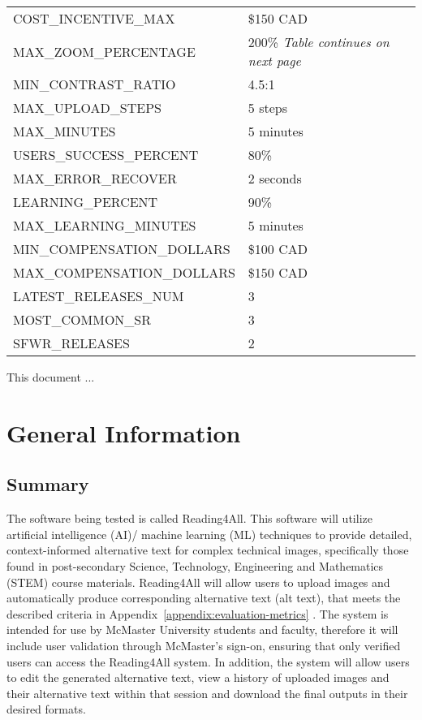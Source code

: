 \documentclass[12pt, titlepage]{article}
\begin{document}
\begin{longtable}{|p{8.0cm}|p{8.0cm}|}
COST\_INCENTIVE\_MAX & \$150 CAD \\
MAX\_ZOOM\_PERCENTAGE & 200\% \qquad\textit{Table continues on next page}\\
MIN\_CONTRAST\_RATIO & 4.5:1\\
MAX\_UPLOAD\_STEPS & 5 steps\\
MAX\_MINUTES & 5 minutes\\
USERS\_SUCCESS\_PERCENT & 80\%\\
MAX\_ERROR\_RECOVER & 2 seconds \\
LEARNING\_PERCENT & 90\% \\
MAX\_LEARNING\_MINUTES & 5 minutes \\
MIN\_COMPENSATION\_DOLLARS & \$100 CAD \\ 
MAX\_COMPENSATION\_DOLLARS & \$150 CAD \\ 
LATEST\_RELEASES\_NUM & 3 \\
MOST\_COMMON\_SR & 3 \\
SFWR\_RELEASES & 2 \\


\bottomrule
\end{longtable}

\newpage


This document ... 

\section{General Information}

\subsection{Summary}


The software being tested is called Reading4All. This software will utilize artificial intelligence (AI)/
machine learning (ML) techniques to provide detailed, context-informed alternative text for complex technical images, specifically those found in post-secondary Science, Technology, Engineering and Mathematics (STEM)
course materials. Reading4All will allow users to upload images and automatically produce corresponding alternative text (alt text), that meets the described criteria in Appendix~\ref{appendix:evaluation-metrics} . The system is intended for use by McMaster University students and faculty, therefore it will include user validation through McMaster's sign-on, ensuring that only verified users can access the Reading4All system.  
In addition, the system will allow users to edit the generated alternative text, view a history of uploaded images and their alternative text within that session and download the final outputs in their desired formats.
\end{document}
